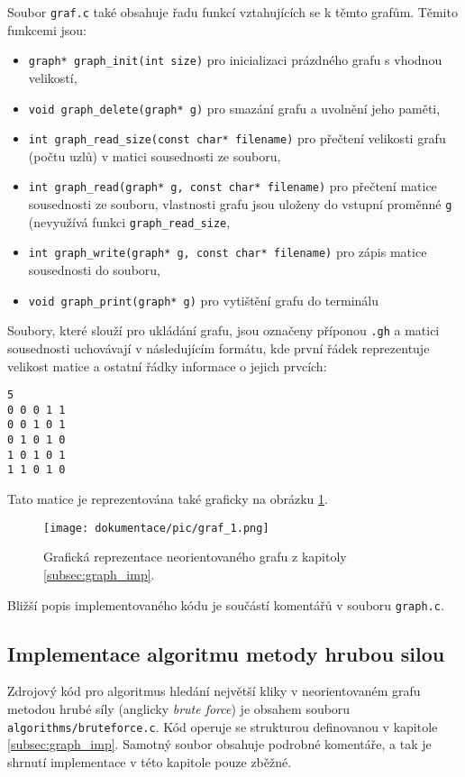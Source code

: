 \documentclass[a4paper]{article}
\begin{document}
        \noindent
        Soubor \lstinline{graf.c} také obsahuje řadu funkcí vztahujících se k těmto grafům. Těmito funkcemi jsou:
        \begin{itemize}
            \item \lstinline{graph* graph_init(int size)} pro inicializaci prázdného grafu s vhodnou velikostí,
            \item \lstinline{void graph_delete(graph* g)} pro smazání grafu a uvolnění jeho paměti,
            \item \lstinline{int graph_read_size(const char* filename)} pro přečtení velikosti grafu (počtu uzlů) v matici sousednosti ze souboru,
            \item \lstinline{int graph_read(graph* g, const char* filename)} pro přečtení matice sousednosti ze souboru, vlastnosti grafu jsou uloženy do vstupní proměnné \lstinline{g} (nevyužívá funkci \lstinline{graph_read_size},
            \item \lstinline{int graph_write(graph* g, const char* filename)} pro zápis matice sousednosti do souboru,
            \item \lstinline{void graph_print(graph* g)} pro vytištění grafu do terminálu
        \end{itemize}

        \noindent
        Soubory, které slouží pro ukládání grafu, jsou označeny příponou \lstinline{.gh} a matici sousednosti uchovávají v následujícím formátu, kde první řádek reprezentuje velikost matice a ostatní řádky informace o jejich prvcích:
        \begin{lstlisting}[caption={Zápis matice v \lstinline{.gh} souboru.},captionpos=b,label={code:zapis_matice}]
5
0 0 0 1 1
0 0 1 0 1
0 1 0 1 0
1 0 1 0 1
1 1 0 1 0
        \end{lstlisting}
        Tato matice je reprezentována také graficky na obrázku \ref{fig:graf1}.
        \begin{figure}[bh]
            \centering
            \texttt{[image: dokumentace/pic/graf\_1.png]}
            \caption{Grafická reprezentace neorientovaného grafu z kapitoly \ref{subsec:graph_imp}.}
            \label{fig:graf1}
        \end{figure}

        \noindent
        Bližší popis implementovaného kódu je součástí komentářů v souboru \lstinline{graph.c}.

    \subsection{Implementace algoritmu metody hrubou silou}
        Zdrojový kód pro algoritmus hledání největší kliky v neorientovaném grafu metodou hrubé síly (anglicky \textit{brute force}) je obsahem souboru \lstinline{algorithms/bruteforce.c}. Kód operuje se strukturou definovanou v kapitole \ref{subsec:graph_imp}. Samotný soubor obsahuje podrobné komentáře, a tak je shrnutí implementace v této kapitole pouze zběžné.\\
\end{document}
